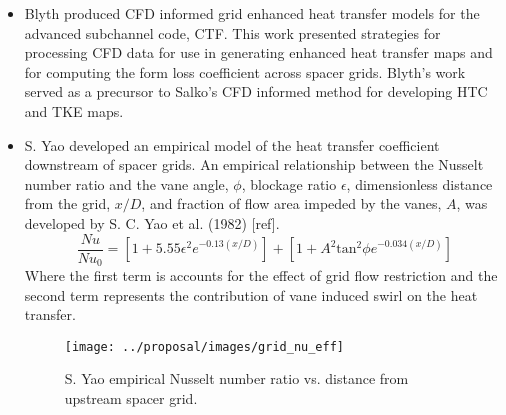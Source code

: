 \begin{itemize}
    \item  Blyth produced CFD informed grid enhanced heat transfer models for the advanced subchannel code, CTF.  This work presented strategies for processing CFD data for use in generating enhanced heat transfer maps and for computing the form loss coefficient across spacer grids.  Blyth's work served as a precursor to Salko's CFD informed method for developing HTC and TKE maps.
    
    
    \item S. Yao developed an empirical model of the heat transfer coefficient downstream of spacer grids. \cite{yao82}
    An empirical relationship between the Nusselt number ratio and the vane angle, $\phi$, blockage ratio $\epsilon$, dimensionless distance from the grid, $x/D$, and fraction of flow area impeded by the vanes, $A$, was developed by S. C. Yao et al. (1982) [ref].
\begin{equation}
\frac{Nu}{Nu_0}  = \left[ 1 + 5.55 \epsilon^2 e^{-0.13(x/D)}\right] + \left[ 1 + A^2\mathrm{tan}^2\phi e^{-0.034(x/D)} \right]
\end{equation}
Where the first term is accounts for the effect of grid flow restriction and the second term represents the contribution of vane induced swirl on the heat transfer.

\begin{figure}[H]
    \centering
    \texttt{[image: ../proposal/images/grid\_nu\_eff]}
    \caption{S. Yao empirical Nusselt number ratio vs. distance from upstream spacer grid.}
    \label{fig:gridnueff}
\end{figure}


\end{itemize}

